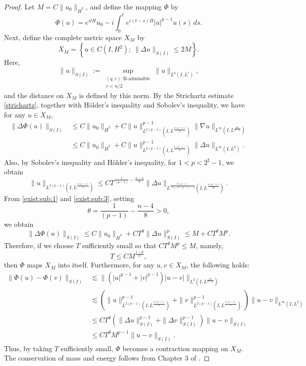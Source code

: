 \documentclass[11pt,a4paper]{article}
\numberwithin{equation}{section}
\begin{document}
\begin{proof}
Let $M = C\|u_{0}\|_{\dot{H}^{2}}$, and define the mapping $\Phi$ by
\[
\Phi(u) = e^{itH}u_{0} - i\int_{0}^{t}e^{i(t-s)H}|u|^{p-1}u(s)\, ds.
\]
Next, define the complete metric space $X_{M}$ by
\[
X_{M} = \left\{ u \in C(I, H^{2}) ;\ \|\Delta u \|_{S(I)} \leq 2M \right\}.
\]
Here,
\[
\|u\|_{S(I)} := \sup_{\substack{(q, r):\text{B-admissible} \\ r < n/2}}\|u\|_{L^{q}(I,L^{r})},
\]
and the distance on $X_M$ is defined by this norm.
By the Strichartz estimate \eqref{strichartz}, together with H\"{o}lder's inequality and Sobolev's inequality, we have for any $u \in X_{M}$,
\begin{equation}\label{exist:sub:1}
\begin{aligned}
\|\Delta \Phi(u) \|_{S(I)}
&\leq C\|u_{0}\|_{\dot{H}^{2}} + C\|u\|^{p - 1}_{L^{2(p-1)}(I, L^{\frac{n(p-1)}{2}})}\| \nabla  u\|_{L^{\infty}(I, L^{\frac{2n}{n-2}})} \\
&\leq C\|u_{0}\|_{\dot{H}^{2}} + C\|u\|^{p - 1}_{L^{2(p-1)}(I, L^{\frac{n(p-1)}{2}})}\| \Delta  u\|_{L^{\infty}(I, L^{2})}.
\end{aligned}
\end{equation}
Also, by Sobolev's inequality and H\"{o}lder's inequality, for $1 < p < 2^{\sharp} - 1$, we obtain
\begin{equation}\label{exist:sub:3}
\|u\|_{L^{2(p-1)}(I, L^{\frac{n(p-1)}{2}})} \leq C T^{\frac{1}{(p-1)} - \frac{n - 4}{8}} \|\Delta u \|_{L^{\frac{8(p-1)}{(n-4)(p-1) - 4}}(I, L^{\frac{n(p-1)}{2p}})}.
\end{equation}
From \eqref{exist:sub:1} and \eqref{exist:sub:3}, setting
\[
\theta = \frac{1}{(p-1)} - \frac{n - 4}{8} > 0,
\]
we obtain
\[
\| \Delta  \Phi(u) \|_{S(I)} \leq C\|u_{0}\|_{\dot{H}^{2}} + CT^{\theta}\| \Delta  u\|^{p}_{S(I)} \leq M + CT^{\theta}M^{p}.
\]
Therefore, if we choose $T$ sufficiently small so that $CT^{\theta}M^{p} \leq M$, namely,
\[
T \leq CM^{\frac{1-p}{\theta}},
\]
then $\Phi$ maps $X_{M}$ into itself.
Furthermore, for any $u, v \in X_{M}$, the following holds:
\begin{align*}
\| \Phi(u) - \Phi(v) \|_{S(I)}
&\lesssim \|(|u|^{p-1} + |v|^{p-1})|u-v|\|_{L^{2}(I, L^{\frac{2n}{n+4}})} \\
&\lesssim \left(\|u\|^{p - 1}_{L^{2(p-1)}(I, L^{\frac{n(p-1)}{2}})} + \|v\|^{p - 1}_{L^{2(p-1)}(I, L^{\frac{n(p-1)}{2}})}\right)\| u -v \|_{L^{\infty}(I, L^{2})}\\
&\leq CT^{\theta}\left( \| \Delta u\|^{p - 1}_{S(I)} + \|\Delta  v\|^{p - 1}_{S(I)} \right) \|u - v\|_{S(I)}\\
&\leq CT^{\theta}M^{p-1} \|u - v\|_{S(I)}.
\end{align*}
Thus, by taking $T$ sufficiently small, $\Phi$ becomes a contraction mapping on $X_M$.
The conservation of mass and energy follows from Chapter 3 of \cite{Caz}.
\end{proof}
\end{document}
